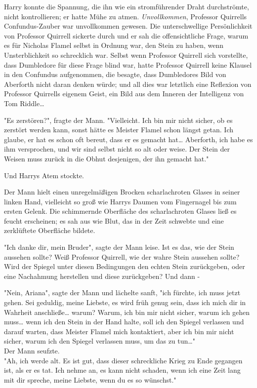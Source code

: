 {Harry konnte die Spannung, die ihn wie ein stromführender Draht durchströmte, nicht kontrollieren; er hatte Mühe zu atmen. \emph{Unvollkommen}, Professor Quirrells Confundus-Zauber war unvollkommen gewesen. Die unterschwellige Persönlichkeit von Professor Quirrell sickerte durch und er sah die offensichtliche Frage, warum es für Nicholas Flamel selbst in Ordnung war, den Stein zu haben, wenn Unsterblichkeit so schrecklich war. Selbst wenn Professor Quirrell sich vorstellte, dass Dumbledore für diese Frage blind war, hatte Professor Quirrell keine Klausel in den Confundus aufgenommen, die besagte, dass Dumbledores Bild von Aberforth nicht daran denken würde; und all dies war letztlich eine Reflexion von Professor Quirrells eigenem Geist, ein Bild aus dem Inneren der Intelligenz von Tom Riddle…

"Es zerstören?", fragte der Mann. "Vielleicht. Ich bin mir nicht sicher, ob es zerstört werden kann, sonst hätte es Meister Flamel schon längst getan. Ich glaube, er hat es schon oft bereut, dass er es gemacht hat… Aberforth, ich habe es ihm versprochen, und wir sind selbst nicht so alt oder weise. Der Stein der Weisen muss zurück in die Obhut desjenigen, der ihn gemacht hat."

Und Harrys Atem stockte.

Der Mann hielt einen unregelmäßigen Brocken scharlachroten Glases in seiner linken Hand, vielleicht so groß wie Harrys Daumen vom Fingernagel bis zum ersten Gelenk. Die schimmernde Oberfläche des scharlachroten Glases ließ es feucht erscheinen; es sah aus wie Blut, das in der Zeit schwebte und eine zerklüftete Oberfläche bildete.

"Ich danke dir, mein Bruder", sagte der Mann leise. Ist es das, wie der Stein aussehen sollte? Weiß Professor Quirrell, wie der wahre Stein aussehen sollte? Wird der Spiegel unter diesen Bedingungen den echten Stein zurückgeben, oder eine Nachahmung herstellen und diese zurückgeben? Und dann -

"Nein, Ariana", sagte der Mann und lächelte sanft, "ich fürchte, ich muss jetzt gehen. Sei geduldig, meine Liebste, es wird früh genug sein, dass ich mich dir in Wahrheit anschließe… warum? Warum, ich bin mir nicht sicher, warum ich gehen muss… wenn ich den Stein in der Hand halte, soll ich den Spiegel verlassen und darauf warten, dass Meister Flamel mich kontaktiert, aber ich bin mir nicht sicher, warum ich den Spiegel verlassen muss, um das zu tun…"\\ Der Mann seufzte.\\ "Ah, ich werde alt. Es ist gut, dass dieser schreckliche Krieg zu Ende gegangen ist, als er es tat. Ich nehme an, es kann nicht schaden, wenn ich eine Zeit lang mit dir spreche, meine Liebste, wenn du es so wünschst."

}

